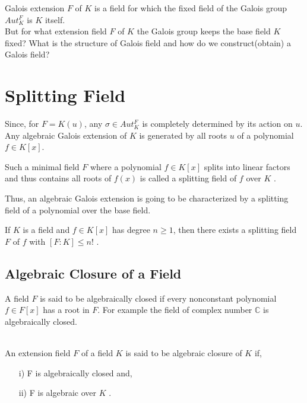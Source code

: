 Galois extension \(F\) of  \(K\) is a field for which the fixed field of the Galois group \(Aut_K^F\) is \(K\) itself.\\
But for what extension field \(F\) of \(K\) the Galois group keeps the base field \(K\) fixed? What is the structure of Galois field and how do we construct(obtain) a Galois field?


\section{Splitting Field}
Since, for \(F=K(u)\), any \(\sigma \in Aut_K^F\) is completely determined by its action on \(u\). Any algebraic Galois extension of \(K\) is generated by all roots \(u\) of a polynomial \(f \in K[x]\).

\begin{definition}
  Such a minimal field \(F\) where a polynomial \(f \in K[x]\) splits into linear factors and thus contains all roots of \(f(x)\) is called a splitting field of \(f\) over \(K\) \cite{hunger}.
\end{definition}
Thus, an algebraic Galois extension is going to be characterized by a splitting field of a polynomial over the base field.\\

\begin{theorem}
  If \(K\) is a field and \(f \in K[x]\) has degree \(n \geq 1\), then there exists a splitting field \(F\) of \(f\) with \([F:K] \leq n!\) \cite{hunger}.
  \end{theorem}

\subsection{Algebraic Closure of a Field}
A field \(F\) is said to be algebraically closed if every nonconstant polynomial \(f \in F[x]\) has a root in \(F\).
For example the field of complex number \(\mathbb{C}\) is algebraically closed.\\ \\

\begin{definition}
An extension field \(F\) of a field \(K\) is said to be algebraic closure of \(K\) if,
\begin{enumerate}
\item[i)] F is algebraically closed and,
  \item[ii)] F is algebraic over \(K\) \cite{hunger}.
  \end{enumerate}
\end{definition}



